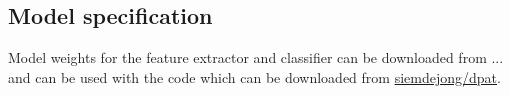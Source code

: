 \subsection{Model specification}
Model weights for the feature extractor and classifier can be downloaded from ... and can be used with the code which can be downloaded from \href{https://github.io/siemdejong/dpat}{ siemdejong/dpat}.